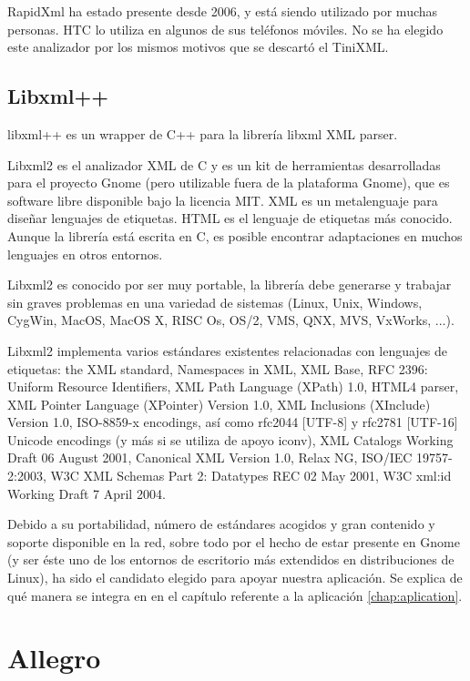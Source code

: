 RapidXml ha estado presente desde 2006, y está siendo utilizado por muchas
personas. HTC lo utiliza en algunos de sus teléfonos móviles. No se ha elegido
este analizador por los mismos motivos que se descartó el TiniXML.

\subsection{Libxml++} \label{sec:LIBXML}

libxml++ \cite{Cumming:2012:LIB} es un wrapper de C++ para la librería libxml
XML parser.

Libxml2 es el analizador XML de C y es un kit de herramientas desarrolladas para
el proyecto Gnome (pero utilizable fuera de la plataforma Gnome), que es
software libre disponible bajo la licencia MIT. XML es un metalenguaje para
diseñar lenguajes de etiquetas. HTML es el lenguaje de etiquetas más conocido. 
Aunque la librería está escrita en C, es posible encontrar adaptaciones en muchos
lenguajes en otros entornos. 

Libxml2 es conocido por ser muy portable, la librería debe generarse y trabajar
sin graves problemas en una variedad de sistemas (Linux, Unix, Windows, CygWin,
MacOS, MacOS X, RISC Os, OS/2, VMS, QNX, MVS, VxWorks, ...).

Libxml2 implementa varios estándares existentes relacionadas con lenguajes de
etiquetas:
the XML standard, Namespaces in XML, XML Base, RFC 2396: Uniform Resource 
Identifiers, XML Path Language (XPath) 1.0, HTML4 parser, XML Pointer Language 
(XPointer) Version 1.0, XML Inclusions (XInclude) Version 1.0, ISO-8859-x 
encodings, así como rfc2044 [UTF-8] y rfc2781 [UTF-16] Unicode encodings (y más
si se utiliza de apoyo iconv), XML Catalogs Working Draft 06 August 2001, 
Canonical XML Version 1.0, Relax NG, ISO/IEC 19757-2:2003, W3C XML Schemas Part
2: Datatypes REC 02 May 2001, W3C xml:id Working Draft 7 April 2004.

Debido a su portabilidad, número de estándares acogidos y gran contenido y
soporte disponible en la red, sobre todo por el hecho de estar presente en Gnome
(y ser éste uno de los entornos de escritorio más extendidos en distribuciones
de Linux), ha sido el candidato elegido para apoyar nuestra aplicación.
Se explica de qué manera se integra en \CSUO{} en el capítulo referente a
la aplicación \ref{chap:aplication}.

\section{Allegro} \label{sec:Allegro}

